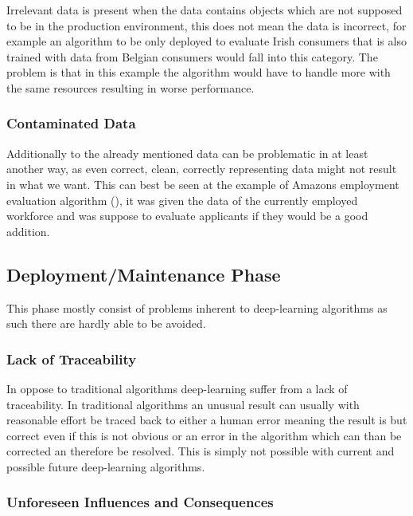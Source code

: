 Irrelevant data is present when the data contains 
objects which are not supposed to be in the production 
environment, this does not mean the data is incorrect,
for example an algorithm to be only deployed to evaluate
Irish consumers that is also trained with data from 
Belgian consumers would fall into this category.
The problem is that in this example the algorithm
would have to handle more with the same resources resulting
in worse performance.

\subsubsection{Contaminated Data}

Additionally to the already mentioned data can be problematic 
in at least another way, as even correct, clean, correctly representing data might not result in what we want.
This can best be seen at the example of Amazons employment evaluation algorithm (\cite{Higginbottom2018}), it was given the data of the currently employed workforce and was suppose to evaluate applicants if they would be a good addition.


\subsection{Deployment/Maintenance Phase}

This phase mostly consist of problems inherent to
deep-learning algorithms as such there are hardly 
able to be avoided.

\subsubsection{Lack of Traceability}

In oppose to traditional algorithms deep-learning
suffer from a lack of traceability.
In traditional algorithms an unusual result can 
usually with reasonable effort be traced back to either 
a human error meaning the result is but correct even if this is not obvious or an error in the algorithm which can than be corrected an therefore be resolved. This is simply not possible with current and possible future deep-learning algorithms. 

\subsubsection{Unforeseen Influences and Consequences}

